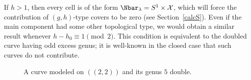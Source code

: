 \begin{remark}
If $h>1$, then every cell is of the form $\Nbar_\lambda=S^1 \times \mathcal{X}$, which will force the contribution of $(g,h)$-type covers to be zero (see Section~\ref{calcS}). Even if the main component had some other topological type, we would obtain a similar result whenever $h-h_0 \equiv 1 \pmod{2}$. This condition is equivalent to the doubled curve having odd excess genus; it is well-known in the closed case that such curves do not contribute.

\begin{figure}[ht]
\centering
{}
\caption{A curve modeled on $((2,2))$ and its genus $5$ double.}
\end{figure}
\end{remark}
